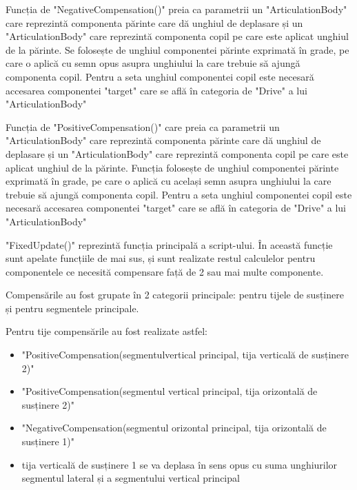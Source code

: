 Funcția de "NegativeCompensation()" preia ca parametrii un "ArticulationBody" care reprezintă componenta părinte care dă unghiul de deplasare și un "ArticulationBody" care reprezintă componenta copil pe care este aplicat unghiul de la părinte. Se folosește de unghiul componentei părinte exprimată în grade, pe care o aplică cu semn opus asupra unghiului la care trebuie să ajungă componenta copil. Pentru a seta unghiul componentei copil este necesară accesarea componentei "target" care se află în categoria de "Drive" a lui "ArticulationBody"
  
  
Funcția de "PositiveCompensation()"  care preia ca parametrii un "ArticulationBody" care reprezintă componenta părinte care dă unghiul de deplasare și un "ArticulationBody" care reprezintă componenta copil pe care este aplicat unghiul de la părinte.  Funcția  folosește de unghiul componentei părinte exprimată în grade, pe care o aplică cu același semn asupra unghiului la care trebuie să ajungă componenta copil. Pentru a seta unghiul componentei copil este necesară accesarea componentei "target" care se află în categoria de "Drive" a lui "ArticulationBody"

 "FixedUpdate()" reprezintă funcția principală a script-ului. În această funcție sunt apelate funcțiile de mai sus, și sunt  realizate restul calculelor pentru componentele ce necesită compensare față de 2 sau mai multe componente.


Compensările au fost grupate în 2 categorii principale: pentru tijele de susținere și pentru segmentele principale.

Pentru tije compensările au fost realizate astfel:
\begin{itemize}
	\item"PositiveCompensation(segmentulvertical principal, tija verticală de susținere 2)"
	
	\item"PositiveCompensation(segmentul vertical principal,  tija orizontală de susținere 2)"
	
	
	
	\item "NegativeCompensation(segmentul orizontal principal, tija orizontală de susținere 1)"
	
	
	
	\item  tija verticală de susținere 1 se va deplasa în sens opus cu suma unghiurilor segmentul lateral  și a segmentului vertical principal
\end{itemize}

